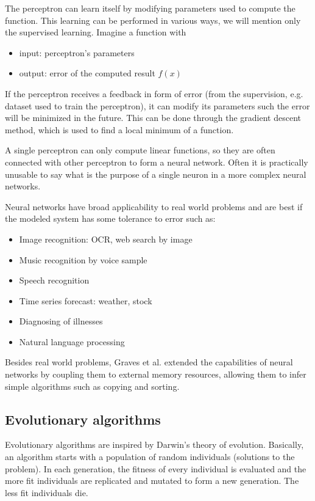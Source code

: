 The perceptron can learn itself by modifying parameters used to compute the function. This learning can be performed in various ways, we will mention only the supervised learning. Imagine a function with
\begin{itemize}
  \item input: perceptron's parameters
  \item output: error of the computed result $f(x)$
\end{itemize}
If the perceptron receives a feedback in form of error (from the supervision, e.g. dataset used to train the perceptron), it can modify its parameters such the error will be minimized in the future. This can be done through the gradient descent method, which is used to find a local minimum of a function.

A single perceptron can only compute linear functions, so they are often connected with other perceptron to form a neural network. Often it is practically unusable to say what is the purpose of a single neuron in a more complex neural networks.

Neural networks have broad applicability to real world problems and are best if the modeled system has some tolerance to error such as:
\begin{itemize}
  \item Image recognition: OCR, web search by image
  \item Music recognition by voice sample
  \item Speech recognition
  \item Time series forecast: weather, stock
  \item Diagnosing of illnesses
  \item Natural language processing
\end{itemize}

Besides real world problems, Graves et al. \cite{Graves14NeuralTM} extended the capabilities of neural networks by coupling them to external memory resources, allowing them to infer simple algorithms such as copying and sorting.


\subsection{Evolutionary algorithms} %
\label{sub:evolutionary_algorithms}

 Evolutionary algorithms are inspired by Darwin's theory of evolution. Basically, an algorithm starts with a population of random individuals (solutions to the problem). In each generation, the fitness of every individual is evaluated and the more fit individuals are replicated and mutated to form a new generation. The less fit individuals die.

